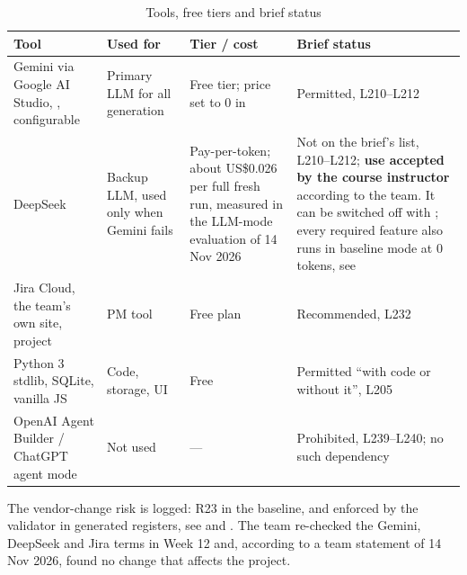 \begin{table}[htbp]
\centering\footnotesize
\caption{Tools, free tiers and brief status}
\label{tab:tools}
\begin{tabularx}{\textwidth}{>{\raggedright\arraybackslash}p{3.3cm}>{\raggedright\arraybackslash}p{2.5cm}>{\raggedright\arraybackslash}p{3.6cm}L}
\toprule
\textbf{Tool} & \textbf{Used for} & \textbf{Tier / cost} & \textbf{Brief status} \\
\midrule
Gemini via Google AI Studio, , configurable & Primary LLM for all generation & Free tier; price set to 0 in  & Permitted, L210--L212 \\
DeepSeek  & Backup LLM, used only when Gemini fails & Pay-per-token; about US\$0.026 per full fresh run, measured in the LLM-mode evaluation of 14 Nov 2026 & Not on the brief's list, L210--L212; \textbf{use accepted by the course instructor} according to the team. It can be switched off with ; every required feature also runs in baseline mode at 0 tokens, see  \\
Jira Cloud, the team's own site, project  & PM tool & Free plan & Recommended, L232 \\
Python 3 stdlib, SQLite, vanilla JS & Code, storage, UI & Free & Permitted ``with code or without it'', L205 \\
OpenAI Agent Builder / ChatGPT agent mode & Not used & --- & Prohibited, L239--L240; no such dependency \\
\bottomrule
\end{tabularx}
\end{table}

The vendor-change risk is logged: R23 in the baseline, and enforced by the validator in generated registers, see  and . The team re-checked the Gemini, DeepSeek and Jira terms in Week 12 and, according to a team statement of 14 Nov 2026, found no change that affects the project.
